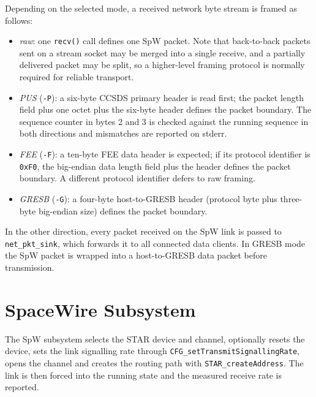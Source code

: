 Depending on the selected mode, a received network byte stream is framed as
follows:

\begin{itemize}

\item \emph{raw}: one \texttt{recv()} call defines one \gls{SpW} packet. Note
that back-to-back packets sent on a stream socket may be merged into a single
receive, and a partially delivered packet may be split, so a higher-level
framing protocol is normally required for reliable transport.\\

\item \emph{PUS} (\texttt{-P}): a six-byte CCSDS primary header is read
first; the packet length field plus one octet plus the six-byte header
defines the packet boundary. The sequence counter in bytes 2 and 3 is checked
against the running sequence in both directions and mismatches are reported
on {\ttfamily stderr}.\\

\item \emph{FEE} (\texttt{-F}): a ten-byte FEE data header is expected; if
its protocol identifier is \texttt{0xF0}, the big-endian data length field
plus the header defines the packet boundary. A different protocol identifier
defers to raw framing.\\

\item \emph{GRESB} (\texttt{-G}): a four-byte host-to-GRESB header (protocol
byte plus three-byte big-endian size) defines the packet boundary.\\

\end{itemize}

In the other direction, every packet received on the \gls{SpW} link is passed
to \texttt{net\_pkt\_sink}, which forwards it to all connected data clients.
In GRESB mode the \gls{SpW} packet is wrapped into a host-to-GRESB data packet
before transmission.

\section{SpaceWire Subsystem}

The \gls{SpW} subsystem selects the STAR device and channel, optionally resets
the device, sets the link signalling rate through
\texttt{CFG\_setTransmitSignallingRate}, opens the channel and creates the
routing path with \texttt{STAR\_createAddress}. The link is then forced into
the running state and the measured receive rate is reported.
\\

